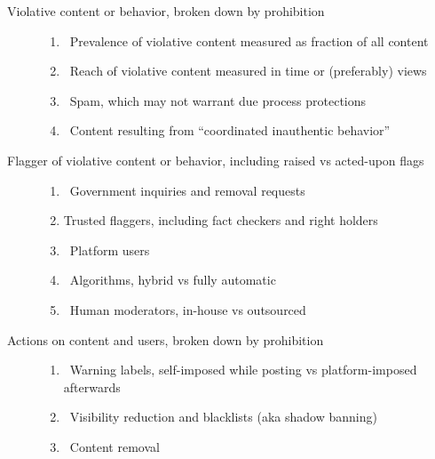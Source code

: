 
\begin{description}
\item[Violative content or behavior, broken down by prohibition]\hfill
    \begin{enumerate}
        \item {}~Prevalence of violative content measured as
            fraction of all content \label{itm:prevalence}
        \item {}~Reach of violative content measured in time
            or (preferably) views \label{itm:reach}
        \item {}~Spam, which may not warrant due process
            protections \label{itm:spam}
        \item {}~Content resulting from ``coordinated inauthentic
            behavior'' \label{itm:coordination}
    \end{enumerate}
\item[Flagger of violative content or behavior, including raised vs acted-upon flags]
    \hfill
    \begin{enumerate}[resume]
        \item {}~Government inquiries and removal requests
            \label{itm:government}
        \item {} Trusted flaggers, including fact checkers and 
            right holders \label{itm:flaggers}
        \item {}~Platform users \label{itm:users}
        \item {}~Algorithms, hybrid vs fully automatic
            \label{itm:algorithms}
        \item {}~Human moderators, in-house vs outsourced
            \label{criterion:moderators}
    \end{enumerate}
\item[Actions on content and users, broken down by prohibition]\hfill
    \begin{enumerate}[resume]
        \item {}~Warning labels, self-imposed while posting vs
            platform-imposed afterwards \label{itm:labels}
        \item {}~Visibility reduction and blacklists (aka shadow
            banning) \label{itm:visibility}
        \item {}~Content removal \label{itm:removal}

\end{enumerate}
\end{description}
